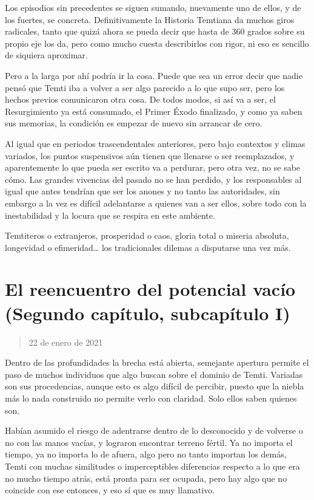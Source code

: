 \documentclass[
  spanish,
]{book}
\begin{document}
Los episodios sin precedentes se siguen sumando, nuevamente uno de ellos, y de los fuertes, se concreta. Definitivamente la Historia Temtiana da muchos giros radicales, tanto que quizá ahora se pueda decir que hasta de 360 grados sobre su propio eje los da, pero como mucho cuesta describirlos con rigor, ni eso es sencillo de siquiera aproximar.

Pero a la larga por ahí podría ir la cosa. Puede que sea un error decir que nadie pensó que Temti iba a volver a ser algo parecido a lo que supo ser, pero los hechos previos comunicaron otra cosa. De todos modos, si así va a ser, el Resurgimiento ya está consumado, el Primer Éxodo finalizado, y como ya saben sus memorias, la condición es empezar de nuevo sin arrancar de cero.

Al igual que en periodos trascendentales anteriores, pero bajo contextos y climas variados, los puntos suspensivos aún tienen que llenarse o ser reemplazados, y aparentemente lo que pueda ser escrito va a perdurar, pero otra vez, no se sabe cómo. Las grandes vivencias del pasado no se han perdido, y los responsables al igual que antes tendrían que ser los anones y no tanto las autoridades, sin embargo a la vez es difícil adelantarse a quienes van a ser ellos, sobre todo con la inestabilidad y la locura que se respira en este ambiente.

Temtiteros o extranjeros, prosperidad o caos, gloria total o miseria absoluta, longevidad o efimeridad\ldots{} los tradicionales dilemas a disputarse una vez más.

\hypertarget{el-reencuentro-del-potencial-vacuxedo-segundo-capuxedtulo-subcapuxedtulo-i}{%
\section{El reencuentro del potencial vacío (Segundo capítulo, subcapítulo I)}\label{el-reencuentro-del-potencial-vacuxedo-segundo-capuxedtulo-subcapuxedtulo-i}}

\begin{quote}
22 de enero de 2021
\end{quote}

Dentro de las profundidades la brecha está abierta, semejante apertura permite el paso de muchos individuos que algo buscan sobre el dominio de Temti. Variadas son sus procedencias, aunque esto es algo difícil de percibir, puesto que la niebla más lo nada construido no permite verlo con claridad. Solo ellos saben quienes son.

Habían asumido el riesgo de adentrarse dentro de lo desconocido y de volverse o no con las manos vacías, y lograron encontrar terreno fértil. Ya no importa el tiempo, ya no importa lo de afuera, algo pero no tanto importan los demás, Temti con muchas similitudes o imperceptibles diferencias respecto a lo que era no mucho tiempo atrás, está pronta para ser ocupada, pero hay algo que no coincide con ese entonces, y eso sí que es muy llamativo.
\end{document}
